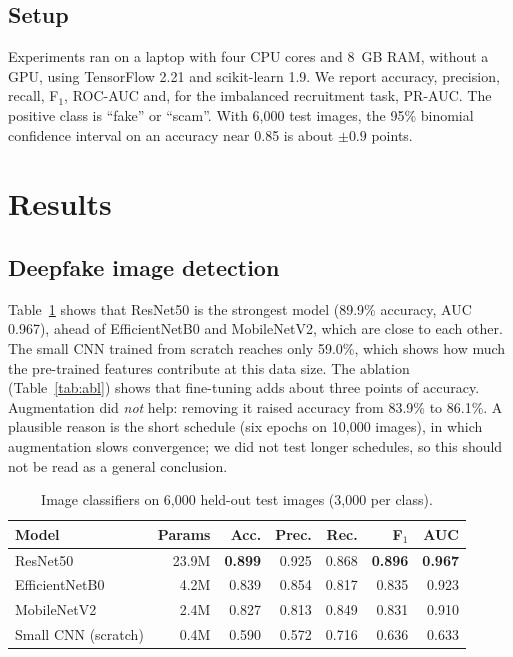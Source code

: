 \documentclass[runningheads]{llncs}
\begin{document}
\subsection{Setup}
Experiments ran on a laptop with four CPU cores and 8~GB RAM, without a GPU, using TensorFlow 2.21 and scikit-learn 1.9. We report accuracy, precision, recall, F$_1$, ROC-AUC and, for the imbalanced recruitment task, PR-AUC. The positive class is ``fake'' or ``scam''. With 6,000 test images, the 95\% binomial confidence interval on an accuracy near 0.85 is about $\pm0.9$ points.

\section{Results}
\subsection{Deepfake image detection}
Table~\ref{tab:img} shows that ResNet50 is the strongest model (89.9\% accuracy, AUC 0.967), ahead of EfficientNetB0 and MobileNetV2, which are close to each other. The small CNN trained from scratch reaches only 59.0\%, which shows how much the pre-trained features contribute at this data size. The ablation (Table~\ref{tab:abl}) shows that fine-tuning adds about three points of accuracy. Augmentation did \emph{not} help: removing it raised accuracy from 83.9\% to 86.1\%. A plausible reason is the short schedule (six epochs on 10,000 images), in which augmentation slows convergence; we did not test longer schedules, so this should not be read as a general conclusion.

\begin{table}[t]
\caption{Image classifiers on 6,000 held-out test images (3,000 per class).}\label{tab:img}
\centering
\begin{tabular}{lrrrrrr}
\toprule
Model & Params & Acc. & Prec. & Rec. & F$_1$ & AUC \\
\midrule
ResNet50 & 23.9M & \textbf{0.899} & 0.925 & 0.868 & \textbf{0.896} & \textbf{0.967} \\
EfficientNetB0 & 4.2M & 0.839 & 0.854 & 0.817 & 0.835 & 0.923 \\
MobileNetV2 & 2.4M & 0.827 & 0.813 & 0.849 & 0.831 & 0.910 \\
Small CNN (scratch) & 0.4M & 0.590 & 0.572 & 0.716 & 0.636 & 0.633 \\
\bottomrule
\end{tabular}
\end{table}
\end{document}

